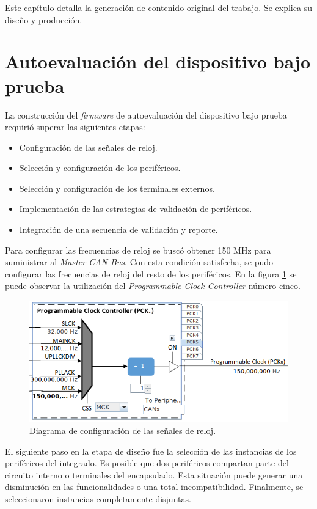 Este capítulo detalla la generación de contenido original del trabajo.
Se explica su diseño y producción.

\section{Autoevaluación del dispositivo bajo prueba}
\label{sec:autoevaluacion}

La construcción del \emph{firmware} de autoevaluación del dispositivo bajo prueba requirió superar las siguientes etapas:
\begin{itemize}
    \item Configuración de las señales de reloj.
    \item Selección y configuración de los periféricos.
    \item Selección y configuración de los terminales externos.
    \item Implementación de las estrategias de validación de periféricos.
    \item Integración de una secuencia de validación y reporte.
\end{itemize}

Para configurar las frecuencias de reloj se buscó obtener 150 MHz para suministrar al \emph{Master CAN Bus}.
Con esta condición satisfecha, se pudo configurar las frecuencias de reloj del resto de los periféricos.
En la figura \ref{fig:clock} se puede observar la utilización del \emph{Programmable Clock Controller} número cinco.

\begin{figure}[htbp]
	\centering
	\includegraphics[width=\textwidth]{./Figures/Clock.png}
    \caption{Diagrama de configuración de las señales de reloj.}
	\label{fig:clock}
\end{figure}

El siguiente paso en la etapa de diseño fue la selección de las instancias de los periféricos del integrado.
Es posible que dos periféricos compartan parte del circuito interno o terminales del encapsulado.
Esta situación puede generar una disminución en las funcionalidades o una total incompatibilidad.
Finalmente, se seleccionaron instancias completamente disjuntas.

